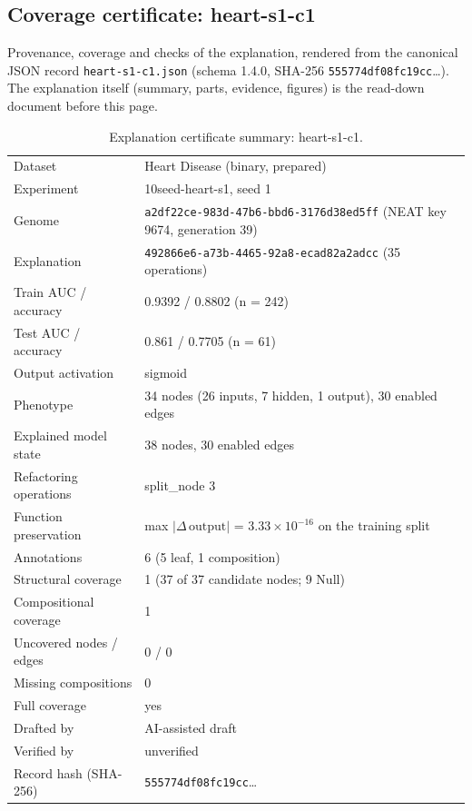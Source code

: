 \providecommand{\explaneatcertdir}[1]{}
\begin{drafted}
\section{Coverage certificate: heart-s1-c1}\label{app:heart-s1-c1:sec}
Provenance, coverage and checks of the explanation, rendered from the canonical JSON record \texttt{heart-s1-c1.json} (schema 1.4.0, SHA-256 \texttt{555774df08fc19cc}\ldots). The explanation itself (summary, parts, evidence, figures) is the read-down document before this page.

\begin{table}[htbp]
\centering\small
\begin{tabularx}{\linewidth}{@{}lX@{}}
\toprule
Dataset & Heart Disease (binary, prepared) \\
Experiment & 10seed-heart-s1, seed 1 \\
Genome & \texttt{a2df22ce-983d-47b6-bbd6-3176d38ed5ff} (NEAT key 9674, generation 39) \\
Explanation & \texttt{492866e6-a73b-4465-92a8-ecad82a2adcc} (35 operations) \\
Train AUC / accuracy & 0.9392 / 0.8802 (n = 242) \\
Test AUC / accuracy & 0.861 / 0.7705 (n = 61) \\
Output activation & sigmoid \\
Phenotype & 34 nodes (26 inputs, 7 hidden, 1 output), 30 enabled edges \\
Explained model state & 38 nodes, 30 enabled edges \\
Refactoring operations & split\_\allowbreak{}node 3 \\
Function preservation & max $|\Delta\,\mathrm{output}|$ = $3.33\times 10^{-16}$ on the training split \\
Annotations & 6 (5 leaf, 1 composition) \\
Structural coverage & 1 (37 of 37 candidate nodes; 9 Null) \\
Compositional coverage & 1 \\
Uncovered nodes / edges & 0 / 0 \\
Missing compositions & 0 \\
Full coverage & yes \\
Drafted by & AI-assisted draft \\
Verified by & unverified \\
Record hash (SHA-256) & \texttt{555774df08fc19cc}\ldots \\
\bottomrule
\end{tabularx}
\caption{Explanation certificate summary: heart-s1-c1.}
\label{app:heart-s1-c1:summary}
\end{table}

\end{drafted}
